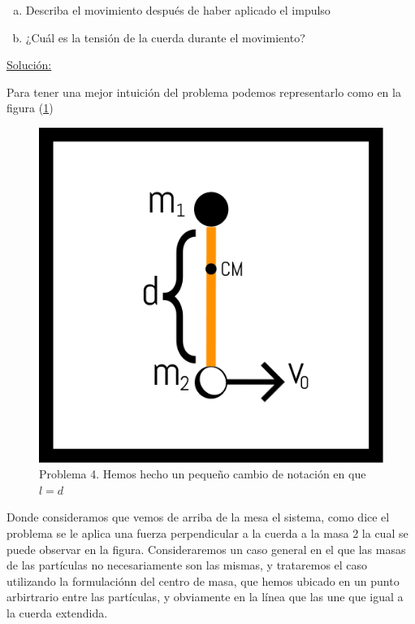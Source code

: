 \documentclass[a4paper,10pt]{article}
\numberwithin{equation}{section}
\begin{document}
\begin{enumerate}[a)]
 \item Describa el movimiento después de haber aplicado el impulso
 \item ¿Cuál es la tensión de la cuerda durante el movimiento?
\end{enumerate}

\vspace{.3cm}

\underline{Solución:}\vspace{.3cm}

Para tener una mejor intuición del problema podemos representarlo como en la figura (\ref{fig:problema4})

\begin{figure}[ht]
 \centering
\includegraphics[scale=0.4]{problema4fig1}
\caption{Problema 4. Hemos hecho un pequeño cambio de notación en que $l=d$}
\label{fig:problema4}
\end{figure}

Donde consideramos que vemos de arriba de la mesa el sistema, como dice el problema
se le aplica una fuerza perpendicular a la cuerda a la masa 2 la cual se puede observar
en la figura. Consideraremos un caso general en el que las masas de las partículas
no necesariamente son las mismas, y trataremos el caso utilizando la formulaciónn
del centro de masa, que hemos ubicado en un punto arbirtrario entre las partículas,
y obviamente en la línea que las une que igual a la cuerda extendida.
\end{document}
